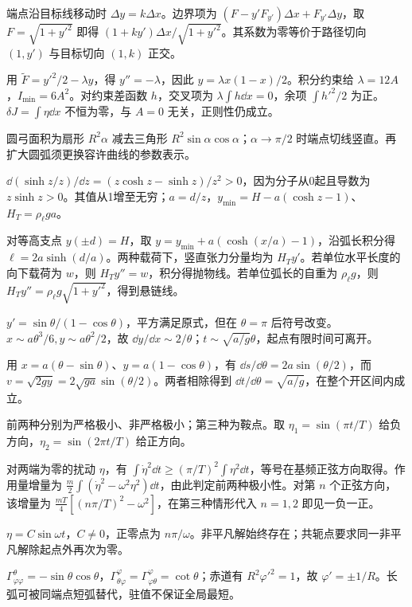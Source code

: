 \begin{bookexercises}
端点沿目标线移动时 $\Delta y=k\Delta x$。边界项为 $(F-y'F_{y'})\Delta x+F_{y'}\Delta y$，取 $F=\sqrt{1+y'^2}$ 即得 $(1+ky')\Delta x/\sqrt{1+y'^2}$。其系数为零等价于路径切向 $(1,y')$ 与目标切向 $(1,k)$ 正交。
\item 用 $\widetilde F=y'^2/2-\lambda y$，得 $y''=-\lambda$，因此 $y=\lambda x(1-x)/2$。积分约束给 $\lambda=12A$，$I_{\min}=6A^2$。对约束差函数 $h$，交叉项为 $\lambda\int h\dd x=0$，余项 $\int h'^2/2$ 为正。$\delta J=\int\eta\dd x$ 不恒为零，与 $A=0$ 无关，正则性仍成立。
\item 圆弓面积为扇形 $R^2\alpha$ 减去三角形 $R^2\sin\alpha\cos\alpha$；$\alpha\to\pi/2$ 时端点切线竖直。再扩大圆弧须更换容许曲线的参数表示。
\item $\dd(\sinh z/z)/\dd z=(z\cosh z-\sinh z)/z^2>0$，因为分子从0起且导数为 $z\sinh z>0$。其值从1增至无穷；$a=d/z$，$y_{\min}=H-a(\cosh z-1)$、$H_T=\rho_\ell ga$。

对等高支点 $y(\pm d)=H$，取 $y=y_{\min}+a(\cosh(x/a)-1)$，沿弧长积分得 $\ell=2a\sinh(d/a)$。两种载荷下，竖直张力分量均为 $H_T y'$。若单位水平长度的向下载荷为 $w$，则 $H_T y''=w$，积分得抛物线。若单位弧长的自重为 $\rho_\ell g$，则 $H_T y''=\rho_\ell g\sqrt{1+y'^2}$，得到悬链线。
\item $y'=\sin\theta/(1-\cos\theta)$，平方满足原式，但在 $\theta=\pi$ 后符号改变。$x\sim a\theta^3/6,y\sim a\theta^2/2$，故 $\dd y/\dd x\sim2/\theta$；$t\sim\sqrt{a/g}\theta$，起点有限时间可离开。

用 $x=a(\theta-\sin\theta)$、$y=a(1-\cos\theta)$，有 $\dd s/\dd\theta=2a\sin(\theta/2)$，而 $v=\sqrt{2gy}=2\sqrt{ga}\sin(\theta/2)$。两者相除得到 $\dd t/\dd\theta=\sqrt{a/g}$，在整个开区间内成立。
\item 前两种分别为严格极小、非严格极小；第三种为鞍点。取 $\eta_1=\sin(\pi t/T)$ 给负方向，$\eta_2=\sin(2\pi t/T)$ 给正方向。

对两端为零的扰动 $\eta$，有 $\int\dot\eta^2\dd t\ge(\pi/T)^2\int\eta^2\dd t$，等号在基频正弦方向取得。作用量增量为 $\tfrac m2\int(\dot\eta^2-\omega^2\eta^2)\dd t$，由此判定前两种极小性。对第 $n$ 个正弦方向，该增量为 $\tfrac{mT}{4}[(n\pi/T)^2-\omega^2]$，在第三种情形代入 $n=1,2$ 即见一负一正。
\item $\eta=C\sin\omega t$，$C\ne0$，正零点为 $n\pi/\omega$。非平凡解始终存在；共轭点要求同一非平凡解除起点外再次为零。
\item $\Gamma^\theta_{\varphi\varphi}=-\sin\theta\cos\theta$，$\Gamma^\varphi_{\theta\varphi}=\Gamma^\varphi_{\varphi\theta}=\cot\theta$；赤道有 $R^2\varphi'^2=1$，故 $\varphi'=\pm1/R$。长弧可被同端点短弧替代，驻值不保证全局最短。


\end{bookexercises}
